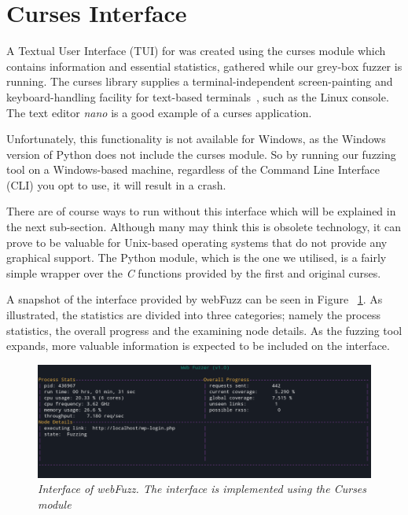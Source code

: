 \section{Curses Interface}
A Textual User Interface (TUI) for \pname{} was created using the curses module which contains information and essential statistics, gathered while our grey-box fuzzer is running. The curses library supplies a terminal-independent screen-painting and keyboard-handling facility for text-based terminals~\cite{curses}, such as the Linux console. The text editor \textit{nano} is a good example of a curses application. 

Unfortunately, this functionality is not available for Windows, as the Windows version of Python does not include the curses module. So by running our fuzzing tool on a Windows-based machine, regardless of the Command Line Interface (CLI) you opt to use, it will result in a crash. 

There are of course ways to run \pname{} without this interface which will be explained in the next sub-section. Although many may think this is obsolete technology, it can prove to be  valuable for Unix-based operating systems that do not provide any graphical support. The Python module, which is the one we utilised, is a fairly simple wrapper over the \textit{C} functions provided by the first and original curses. 

A snapshot of the interface provided by webFuzz can be seen in Figure ~\ref{fig:curses_interface}. As illustrated, the statistics are divided into three categories; namely the process statistics, the overall progress and the examining node details.
As the fuzzing tool expands, more valuable information is expected to be included on the interface.

\begin{figure}[ht]
 \centering
 \captionsetup{justification=centering}
 \includegraphics[width=\linewidth]{figures/curses.png}
 \caption[Interface of webFuzz]
 {\textit{Interface of webFuzz. The interface is implemented using the Curses module}}
 \label{fig:curses_interface}
\end{figure}

